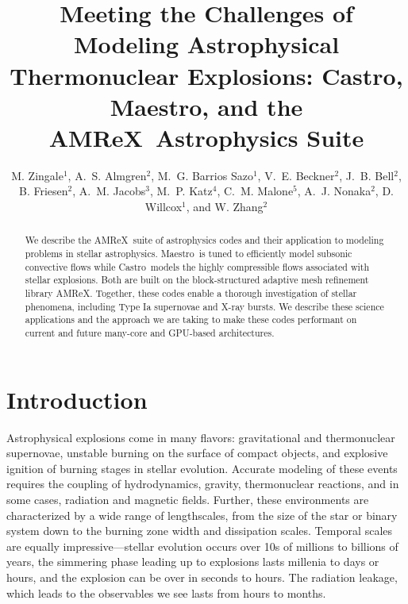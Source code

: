 \documentclass[a4paper]{jpconf}
\newcommand{\maestro}{{\sffamily Maestro}}
\newcommand{\castro}{{\sffamily Castro}}
\newcommand{\amrex}{{\sffamily AMReX}}
\begin{document}
\title{Meeting the Challenges of Modeling Astrophysical Thermonuclear Explosions:
\castro, \maestro, and the \amrex\ Astrophysics Suite}

\author{M. Zingale$^1$,
        A.~S. Almgren$^2$,
        M.~G. Barrios Sazo$^1$,
        V.~E. Beckner$^2$,
        J.~B. Bell$^2$,
        B. Friesen$^2$,
        A.~M. Jacobs$^3$,
        M.~P. Katz$^4$,
        C.~M. Malone$^5$,
        A.~J. Nonaka$^2$,
        D. Willcox$^1$, and
        W. Zhang$^2$}

\address{$^1$Department of Physics and Astronomy, Stony Brook
  University, Stony Brook, NY 11794-3800 USA}

\address{$^2$Center for Computational Sciences and Engineering,
  Lawrence Berkeley National Lab, Berkeley, CA 94720 USA}

\address{$^3$Department of Physics and Astronomy, Michigan State
  University, East Lansing, Michigan 48824 USA}

\address{$^4$Nvidia Corporation}

\address{$^5$Los Alamos National Laboratory, Los Alamos, NM, 87545 USA}

\begin{abstract}
We describe the \amrex\ suite of astrophysics codes and their
application to modeling problems in stellar astrophysics.
\maestro\ is tuned to efficiently model subsonic convective flows
while \castro\ models the highly compressible flows associated with
stellar explosions.  Both are built on the block-structured adaptive
mesh refinement library \amrex.  Together, these codes enable a
thorough investigation of stellar phenomena, including Type Ia
supernovae and X-ray bursts.  We describe these science applications
and the approach we are taking to make these codes performant on
current and future many-core and GPU-based architectures.
\end{abstract}




\section{Introduction}

Astrophysical explosions come in many flavors: gravitational and
thermonuclear supernovae, unstable burning on the surface of compact
objects, and explosive ignition of burning stages in stellar
evolution.  Accurate modeling of these events requires the coupling of
hydrodynamics, gravity, thermonuclear reactions, and in some cases,
radiation and magnetic fields.  Further, these environments are
characterized by a wide range of lengthscales, from the size of the
star or binary system down to the burning zone width and dissipation
scales.  Temporal scales are equally impressive---stellar evolution
occurs over 10s of millions to billions of years, the simmering phase
leading up to explosions lasts millenia to days or hours, and the
explosion can be over in seconds to hours.  The radiation leakage,
which leads to the observables we see lasts from hours to months.
\end{document}

